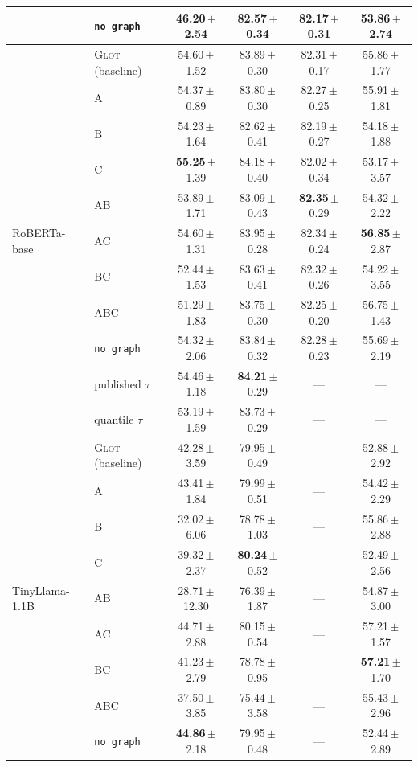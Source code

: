 \documentclass{article}
\begin{document}
\begin{table}[h]
\begin{center}
\begin{tabular}{llcccc}
 & \texttt{no graph}        & 46.20\,$\pm$2.54 & 82.57\,$\pm$0.34 & 82.17\,$\pm$0.31 & 53.86\,$\pm$2.74 \\
\midrule
\multirow{11}{*}{RoBERTa-base}
 & \textsc{Glot} (baseline) & 54.60\,$\pm$1.52 & 83.89\,$\pm$0.30 & 82.31\,$\pm$0.17 & 55.86\,$\pm$1.77 \\
 & A                        & 54.37\,$\pm$0.89 & 83.80\,$\pm$0.30 & 82.27\,$\pm$0.25 & 55.91\,$\pm$1.81 \\
 & B                        & 54.23\,$\pm$1.64 & 82.62\,$\pm$0.41 & 82.19\,$\pm$0.27 & 54.18\,$\pm$1.88 \\
 & C                        & \textbf{55.25}\,$\pm$1.39 & 84.18\,$\pm$0.40 & 82.02\,$\pm$0.34 & 53.17\,$\pm$3.57 \\
 & AB                       & 53.89\,$\pm$1.71 & 83.09\,$\pm$0.43 & \textbf{82.35}\,$\pm$0.29 & 54.32\,$\pm$2.22 \\
 & AC                       & 54.60\,$\pm$1.31 & 83.95\,$\pm$0.28 & 82.34\,$\pm$0.24 & \textbf{56.85}\,$\pm$2.87 \\
 & BC                       & 52.44\,$\pm$1.53 & 83.63\,$\pm$0.41 & 82.32\,$\pm$0.26 & 54.22\,$\pm$3.55 \\
 & ABC                      & 51.29\,$\pm$1.83 & 83.75\,$\pm$0.30 & 82.25\,$\pm$0.20 & 56.75\,$\pm$1.43 \\
 & \texttt{no graph}        & 54.32\,$\pm$2.06 & 83.84\,$\pm$0.32 & 82.28\,$\pm$0.23 & 55.69\,$\pm$2.19 \\
 & published $\tau$         & 54.46\,$\pm$1.18 & \textbf{84.21}\,$\pm$0.29 & --- & --- \\
 & quantile $\tau$          & 53.19\,$\pm$1.59 & 83.73\,$\pm$0.29 & --- & --- \\
\midrule
\multirow{9}{*}{TinyLlama-1.1B}
 & \textsc{Glot} (baseline) & 42.28\,$\pm$3.59 & 79.95\,$\pm$0.49 & --- & 52.88\,$\pm$2.92 \\
 & A                        & 43.41\,$\pm$1.84 & 79.99\,$\pm$0.51 & --- & 54.42\,$\pm$2.29 \\
 & B                        & 32.02\,$\pm$6.06 & 78.78\,$\pm$1.03 & --- & 55.86\,$\pm$2.88 \\
 & C                        & 39.32\,$\pm$2.37 & \textbf{80.24}\,$\pm$0.52 & --- & 52.49\,$\pm$2.56 \\
 & AB                       & 28.71\,$\pm$12.30 & 76.39\,$\pm$1.87 & --- & 54.87\,$\pm$3.00 \\
 & AC                       & 44.71\,$\pm$2.88 & 80.15\,$\pm$0.54 & --- & 57.21\,$\pm$1.57 \\
 & BC                       & 41.23\,$\pm$2.79 & 78.78\,$\pm$0.95 & --- & \textbf{57.21}\,$\pm$1.70 \\
 & ABC                      & 37.50\,$\pm$3.85 & 75.44\,$\pm$3.58 & --- & 55.43\,$\pm$2.96 \\
 & \texttt{no graph}        & \textbf{44.86}\,$\pm$2.18 & 79.95\,$\pm$0.48 & --- & 52.44\,$\pm$2.89 \\
\bottomrule
\end{tabular}
\end{center}
\end{table}
\end{document}
